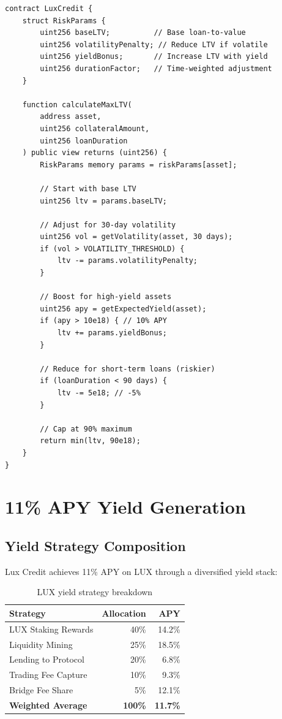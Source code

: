 \documentclass[11pt,a4paper]{article}
\begin{document}
\begin{lstlisting}[language=Solidity, basicstyle=\small\ttfamily]
contract LuxCredit {
    struct RiskParams {
        uint256 baseLTV;          // Base loan-to-value
        uint256 volatilityPenalty; // Reduce LTV if volatile
        uint256 yieldBonus;       // Increase LTV with yield
        uint256 durationFactor;   // Time-weighted adjustment
    }
    
    function calculateMaxLTV(
        address asset,
        uint256 collateralAmount,
        uint256 loanDuration
    ) public view returns (uint256) {
        RiskParams memory params = riskParams[asset];
        
        // Start with base LTV
        uint256 ltv = params.baseLTV;
        
        // Adjust for 30-day volatility
        uint256 vol = getVolatility(asset, 30 days);
        if (vol > VOLATILITY_THRESHOLD) {
            ltv -= params.volatilityPenalty;
        }
        
        // Boost for high-yield assets
        uint256 apy = getExpectedYield(asset);
        if (apy > 10e18) { // 10% APY
            ltv += params.yieldBonus;
        }
        
        // Reduce for short-term loans (riskier)
        if (loanDuration < 90 days) {
            ltv -= 5e18; // -5%
        }
        
        // Cap at 90% maximum
        return min(ltv, 90e18);
    }
}
\end{lstlisting}

\section{11\% APY Yield Generation}

\subsection{Yield Strategy Composition}

Lux Credit achieves 11\% APY on LUX through a diversified yield stack:

\begin{table}[h]
\centering
\begin{tabular}{@{}lrr@{}}
\toprule
\textbf{Strategy} & \textbf{Allocation} & \textbf{APY} \\ \midrule
LUX Staking Rewards & 40\% & 14.2\% \\
Liquidity Mining & 25\% & 18.5\% \\
Lending to Protocol & 20\% & 6.8\% \\
Trading Fee Capture & 10\% & 9.3\% \\
Bridge Fee Share & 5\% & 12.1\% \\ \midrule
\textbf{Weighted Average} & \textbf{100\%} & \textbf{11.7\%} \\ \bottomrule
\end{tabular}
\caption{LUX yield strategy breakdown}
\end{table}
\end{document}
